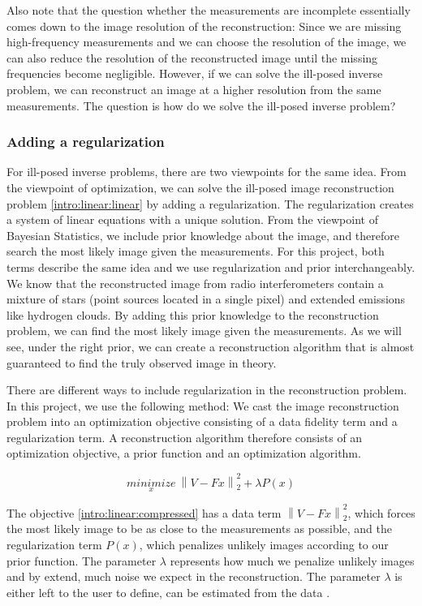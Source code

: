 Also note that the question whether the measurements are incomplete essentially comes down to the image resolution of the reconstruction: Since we are missing high-frequency measurements and we can choose the resolution of the image, we can also reduce the resolution of the reconstructed image until the missing frequencies become negligible. However, if we can solve the ill-posed inverse problem, we can reconstruct an image at a higher resolution from the same measurements. The question is how do we solve the ill-posed inverse problem?

\subsubsection{Adding a regularization} \label{intro:linear:regularization}
For ill-posed inverse problems, there are two viewpoints for the same idea. From the viewpoint of optimization, we can solve the ill-posed image reconstruction problem \eqref{intro:linear:linear} by adding a regularization. The regularization creates a system of linear equations with a unique solution. From the viewpoint of Bayesian Statistics, we include prior knowledge about the image, and therefore search the most likely image given the measurements. For this project, both terms describe the same idea and we use regularization and prior interchangeably. We know that the reconstructed image from radio interferometers contain a mixture of stars (point sources located in a single pixel) and extended emissions like hydrogen clouds. By adding this prior knowledge to the reconstruction problem, we can find the most likely image given the measurements. As we will see, under the right prior, we can create a reconstruction algorithm that is almost guaranteed to find the truly observed image in theory.

There are different ways to include regularization in the reconstruction problem. In this project, we use the following method: We cast the image reconstruction problem into an optimization objective consisting of a data fidelity term and a regularization term. A reconstruction algorithm therefore consists of an optimization objective, a prior function and an optimization algorithm.

\begin{equation}\label{intro:linear:compressed}
\underset{x}{minimize} \: \left \| V - Fx \right \|_2^2 + \lambda P(x)
\end{equation}

The objective \eqref{intro:linear:compressed} has a data term $\left \| V - Fx \right \|_2^2$, which forces the most likely image to be as close to the measurements as possible, and the regularization term $P(x)$, which penalizes unlikely images according to our prior function. The parameter $\lambda$ represents how much we penalize unlikely images and by extend, much noise we expect in the reconstruction. The parameter $\lambda$ is either left to the user to define, can be estimated from the data \cite{miller1970least}. 


